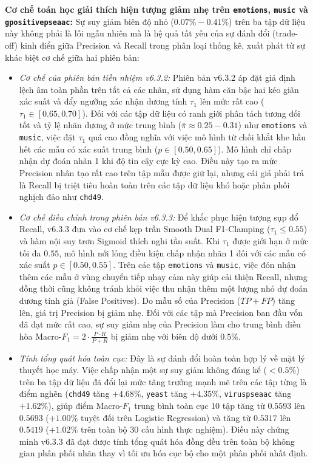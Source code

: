 \documentclass[10pt,a4paper,twoside]{article}
\begin{document}
\noindent\textbf{Cơ chế toán học giải thích hiện tượng giảm nhẹ trên \texttt{emotions}, \texttt{music} và \texttt{gpositivepseaac}:}
Sự suy giảm biên độ nhỏ ($0.07\% - 0.41\%$) trên ba tập dữ liệu này không phải là lỗi ngẫu nhiên mà là hệ quả tất yếu của sự đánh đổi (trade-off) kinh điển giữa Precision và Recall trong phân loại thống kê, xuất phát từ sự khác biệt cơ chế giữa hai phiên bản:
\begin{itemize}[leftmargin=*]
    \item \textit{Cơ chế của phiên bản tiền nhiệm v6.3.2:} Phiên bản v6.3.2 áp đặt giả định lệch âm toàn phần trên tất cả các nhãn,     sử dụng hàm căn bậc hai kéo giãn xác suất và đẩy ngưỡng xác nhận dương tính $\tau_1$ lên mức rất cao ($\tau_1 \in [0.65, 0.70]$).     Đối với các tập dữ liệu có ranh giới phân tách tương đối tốt và tỷ lệ nhãn dương ở mức trung bình ($\bar{\pi} \approx 0.25 - 0.31$) như     \texttt{emotions} và \texttt{music}, việc đặt $\tau_1$ quá cao đồng nghĩa với việc mô hình từ chối khắt khe hầu hết các mẫu có xác suất trung bình     ($p \in [0.50, 0.65]$). Mô hình chỉ chấp nhận dự đoán nhãn 1 khi độ tin cậy cực kỳ cao. Điều này tạo ra mức Precision nhân tạo rất cao     trên tập mẫu được giữ lại, nhưng cái giá phải trả là Recall bị triệt tiêu hoàn toàn trên các tập dữ liệu khó hoặc phân phối nghịch đảo như \texttt{chd49}.
    \item \textit{Cơ chế điều chỉnh trong phiên bản v6.3.3:} Để khắc phục hiện tượng sụp đổ Recall, v6.3.3 đưa vào cơ chế kẹp trần     Smooth Dual F1-Clamping ($\tau_1 \le 0.55$) và hàm nội suy trơn Sigmoid thích nghi tần suất.     Khi $\tau_1$ được giới hạn ở mức tối đa $0.55$, mô hình nới lỏng điều kiện chấp nhận nhãn 1 đối với các mẫu có xác suất $p \in [0.50, 0.55]$.     Trên các tập \texttt{emotions} và \texttt{music}, việc đón nhận thêm các mẫu ở vùng chuyển tiếp nhạy cảm này giúp cải thiện Recall,     nhưng đồng thời cũng không tránh khỏi việc thu nhận thêm một lượng nhỏ dự đoán dương tính giả (False Positives).     Do mẫu số của Precision ($TP + FP$) tăng lên, giá trị Precision bị giảm nhẹ. Đối với các tập mà Precision ban đầu vốn đã đạt mức rất cao,     sự suy giảm nhẹ của Precision làm cho trung bình điều hòa Macro-$F_1 = 2 \cdot \frac{P \cdot R}{P + R}$ bị giảm nhẹ với biên độ dưới $0.5\%$.
    \item \textit{Tính tổng quát hóa toàn cục:} Đây là sự đánh đổi hoàn toàn hợp lý về mặt lý thuyết học máy.     Việc chấp nhận một sự suy giảm không đáng kể ($< 0.5\%$) trên ba tập dữ liệu đã đổi lại mức tăng trưởng mạnh mẽ trên các tập từng là điểm nghẽn     (\texttt{chd49} tăng $+4.68\%$, \texttt{yeast} tăng $+4.35\%$, \texttt{viruspseaac} tăng $+1.62\%$),     giúp điểm Macro-$F_1$ trung bình toàn cục 10 tập tăng từ $0.5593$ lên $0.5693$ ($+1.00\%$ tuyệt đối trên Logistic Regression)     và tăng từ $0.5317$ lên $0.5419$ ($+1.02\%$ trên toàn bộ 30 cấu hình thực nghiệm).     Điều này chứng minh v6.3.3 đã đạt được tính tổng quát hóa đồng đều trên toàn bộ không gian phân phối nhãn thay vì tối ưu hóa cục bộ cho một phân phối nhất định.
\end{itemize}
\end{document}

